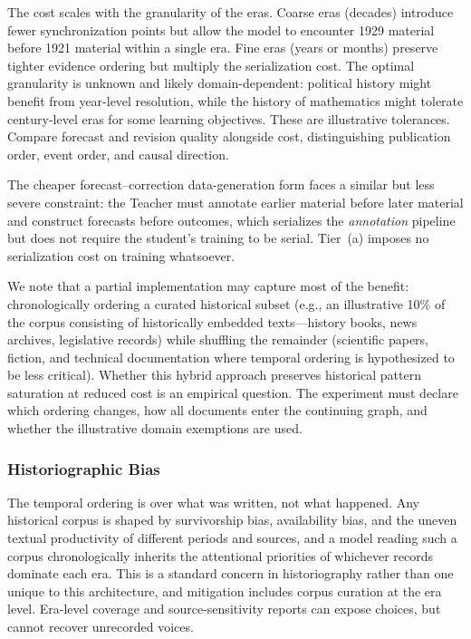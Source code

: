 The cost scales with the granularity of the eras. Coarse eras (decades) introduce fewer synchronization points but allow the model to encounter 1929 material before 1921 material within a single era. Fine eras (years or months) preserve tighter evidence ordering but multiply the serialization cost. The optimal granularity is unknown and likely domain-dependent: political history might benefit from year-level resolution, while the history of mathematics might tolerate century-level eras for some learning objectives. These are illustrative tolerances. Compare forecast and revision quality alongside cost, distinguishing publication order, event order, and causal direction.

The cheaper forecast--correction data-generation form faces a similar but less severe constraint: the Teacher must annotate earlier material before later material and construct forecasts before outcomes, which serializes the \emph{annotation} pipeline but does not require the student's training to be serial. Tier~(a) imposes no serialization cost on training whatsoever.

We note that a partial implementation may capture most of the benefit: chronologically ordering a curated historical subset (e.g., an illustrative 10\% of the corpus consisting of historically embedded texts---history books, news archives, legislative records) while shuffling the remainder (scientific papers, fiction, and technical documentation where temporal ordering is hypothesized to be less critical). Whether this hybrid approach preserves historical pattern saturation at reduced cost is an empirical question. The experiment must declare which ordering changes, how all documents enter the continuing graph, and whether the illustrative domain exemptions are used.

\subsubsection{Historiographic Bias}

The temporal ordering is over what was written, not what happened. Any historical corpus is shaped by survivorship bias, availability bias, and the uneven textual productivity of different periods and sources, and a model reading such a corpus chronologically inherits the attentional priorities of whichever records dominate each era. This is a standard concern in historiography rather than one unique to this architecture, and mitigation includes corpus curation at the era level. Era-level coverage and source-sensitivity reports can expose choices, but cannot recover unrecorded voices.

